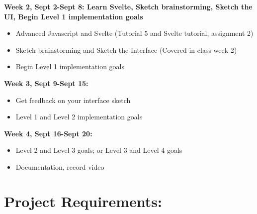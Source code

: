 \documentclass{article}
\begin{document}
\textbf{Week 2, Sept 2-Sept 8: Learn Svelte, Sketch brainstorming, Sketch the UI, Begin Level 1 implementation goals}
\begin{itemize}
    \item Advanced Javascript and Svelte (Tutorial 5 and Svelte tutorial, assignment 2)
    \item Sketch brainstorming and Sketch the Interface (Covered in-class week 2)
    \item Begin Level 1 implementation goals
\end{itemize}

\textbf{Week 3, Sept 9-Sept 15:}
\begin{itemize}
    \item Get feedback on your interface sketch
    \item Level 1 and Level 2 implementation goals
\end{itemize}

\textbf{Week 4, Sept 16-Sept 20:}
\begin{itemize}
    \item Level 2 and Level 3 goals; or Level 3 and Level 4 goals
    \item Documentation, record video
\end{itemize}

\section*{Project Requirements:}

\end{document}
